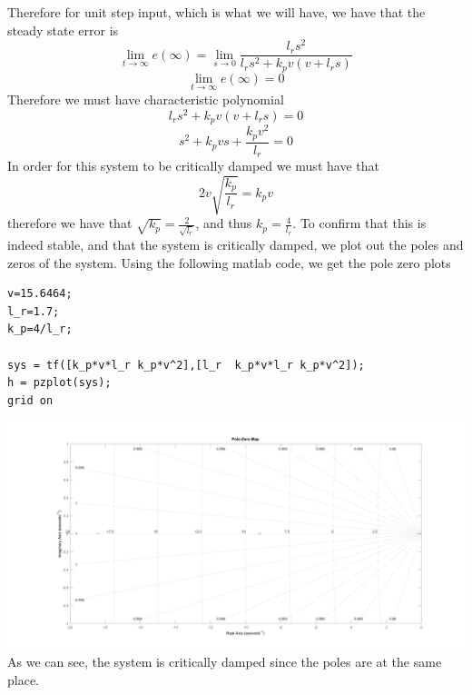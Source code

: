 \documentclass[12pt]{article}
\begin{document}
Therefore for unit step input, which is what we will have, we have that the steady state error is 
$$\lim_{t\to\infty}e(\infty)=\lim_{s\to0}\frac{l_r s^2}{l_r s^2+k_pv(v+l_r s)}$$
$$\lim_{t\to\infty}e(\infty)=0$$
Therefore we must have characteristic polynomial
$$l_r s^2+k_pv(v+l_r s)=0$$
$$s^2+k_pvs+\frac{k_pv^2}{l_r}=0$$
In order for this system to be critically damped we must have that
$$2v\sqrt{\frac{k_p}{l_r}}=k_pv$$
therefore we have that $\sqrt{k_p}=\frac{2}{\sqrt{l_r}}$, and thus $k_p=\frac{4}{l_r}$. To confirm that this is indeed stable, and that the system is critically damped, we plot out
the poles and zeros of the system. Using the following matlab code, we get the pole zero plots
\begin{verbatim}
v=15.6464;
l_r=1.7;
k_p=4/l_r;

sys = tf([k_p*v*l_r k_p*v^2],[l_r  k_p*v*l_r k_p*v^2]);
h = pzplot(sys);
grid on
\end{verbatim}
\includegraphics[scale=0.3]{Problem2Fig1.png}
As we can see, the system is critically damped since the poles are at the same place.
\end{document}
